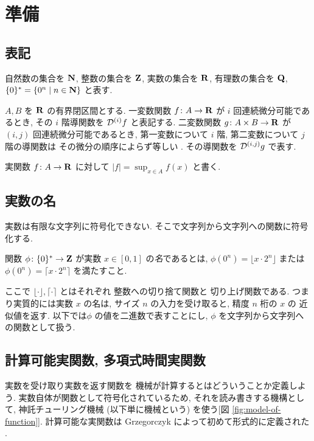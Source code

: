 \section{準備}
\label{section: preliminaries}

\subsection{表記}
自然数の集合を $\mathbf N$, 整数の集合を $\mathbf Z$, 実数の集合を $\mathbf R$, 
有理数の集合を $\mathbf Q$, $\{0\}^* = \{0^n \mid n \in \mathbf N\}$ と表す.

$A, B$ を $\mathbf R$ の有界閉区間とする. 一変数関数 $f\colon A \to \mathbf R$ が $i$ 回連続微分可能であるとき,
その $i$ 階導関数を $\mathcal D^{(i)}f$ と表記する.
二変数関数 $g \colon A \times B \to \mathbf R$ が
$(i, j)$ 回連続微分可能であるとき,
第一変数について $i$ 階, 第二変数について $j$ 階の導関数は
その微分の順序によらず等しい \cite{takagi1968analysis}.
その導関数を $\mathcal D^{(i,j)}g$ で表す.

実関数 $f \colon A \to \mathbf R$ に対して $|f| = \sup_{x \in A} f(x)$ と書く.



\subsection{実数の名}
 実数は有限な文字列に符号化できない. 
 そこで文字列から文字列への関数に符号化する.
 \begin{definition}[実数の名]
  関数 $\phi \colon \{0\}^* \to \mathbf Z $ が実数 $x \in [0,1]$ の\emph{名}であるとは,
  $\phi(0^n) = \lfloor x \cdot 2^n \rfloor$ または
  $\phi(0^n) = \lceil x \cdot 2^n \rceil$ を満たすこと.
 \end{definition}
ここで $\lfloor \cdot \rfloor, \lceil \cdot \rceil$ とはそれぞれ
整数への切り捨て関数と
切り上げ関数である.
つまり実質的には実数 $x$ の名は, 
サイズ $n$ の入力を受け取ると, 精度 $n$ 桁の $x$ の
近似値を返す.
以下では$\phi$ の値を二進数で表すことにし, 
$\phi$ を文字列から文字列への関数として扱う. 



\subsection{計算可能実関数, 多項式時間実関数}

実数を受け取り実数を返す関数を
機械が計算するとはどういうことか定義しよう. 
実数自体が関数として符号化されているため, 
それを読み書きする機構として, 
神託チューリング機械 (以下単に機械という) を使う[図 \ref{fig:model-of-function}].
計算可能な実関数は Grzegorczyk によって初めて形式的に定義された
\cite{grzegorczyk1955computable}.

